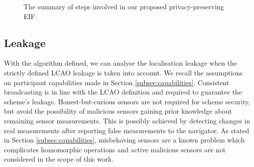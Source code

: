 \documentclass[twocolumn]{autart}
\begin{document}
\begin{figure}[htbp]
\vspace{\baselineskip}
\caption{The summary of steps involved in our proposed privacy-preserving EIF.}
\label{fig:alg_steps}
\end{figure}

% 
% 

\subsection{Leakage} \label{subsec:leakage}
With the algorithm defined, we can analyse the localisation leakage when the strictly defined LCAO leakage is taken into account. We recall the assumptions on participant capabilities made in Section \ref{subsec:capabilities}. Consistent broadcasting is in line with the LCAO definition and required to guarantee the scheme's leakage. Honest-but-curious sensors are not required for scheme security, but avoid the possibility of malicious sensors gaining prior knowledge about remaining sensor measurements. This is possibly achieved by detecting changes in real measurements after reporting false measurements to the navigator. As stated in Section \ref{subsec:capabilities}, misbehaving sensors are a known problem which complicates homomorphic operations and active malicious sensors are not considered in the scope of this work.
\end{document}
